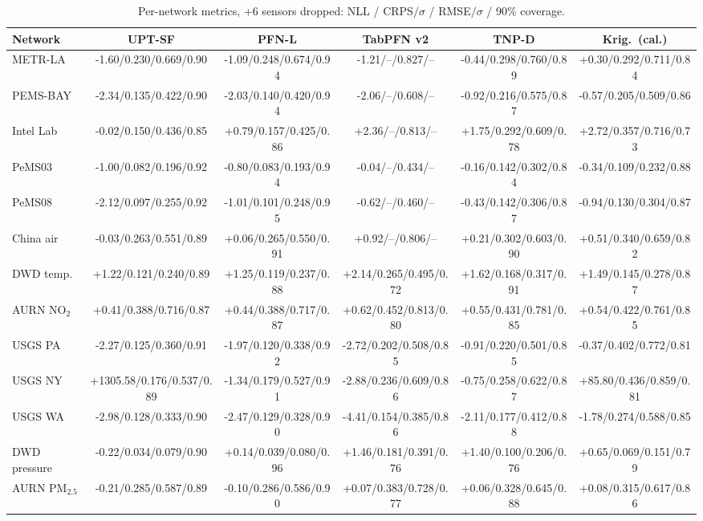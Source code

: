 \begin{table}[h]\centering\scriptsize
\caption{Per-network metrics, +6 sensors dropped: NLL / CRPS$/\sigma$ / RMSE$/\sigma$ / 90\% coverage.}
\setlength{\tabcolsep}{2pt}
\begin{adjustbox}{max width=\linewidth}
\begin{tabular}{lccccc}
\toprule
Network & UPT-SF & PFN-L & TabPFN v2 & TNP-D & Krig.\ (cal.) \\
\midrule
METR-LA & -1.60/0.230/0.669/0.90 & -1.09/0.248/0.674/0.94 & -1.21/--/0.827/-- & -0.44/0.298/0.760/0.89 & +0.30/0.292/0.711/0.84 \\
PEMS-BAY & -2.34/0.135/0.422/0.90 & -2.03/0.140/0.420/0.94 & -2.06/--/0.608/-- & -0.92/0.216/0.575/0.87 & -0.57/0.205/0.509/0.86 \\
Intel Lab & -0.02/0.150/0.436/0.85 & +0.79/0.157/0.425/0.86 & +2.36/--/0.813/-- & +1.75/0.292/0.609/0.78 & +2.72/0.357/0.716/0.73 \\
PeMS03 & -1.00/0.082/0.196/0.92 & -0.80/0.083/0.193/0.94 & -0.04/--/0.434/-- & -0.16/0.142/0.302/0.84 & -0.34/0.109/0.232/0.88 \\
PeMS08 & -2.12/0.097/0.255/0.92 & -1.01/0.101/0.248/0.95 & -0.62/--/0.460/-- & -0.43/0.142/0.306/0.87 & -0.94/0.130/0.304/0.87 \\
China air & -0.03/0.263/0.551/0.89 & +0.06/0.265/0.550/0.91 & +0.92/--/0.806/-- & +0.21/0.302/0.603/0.90 & +0.51/0.340/0.659/0.82 \\
DWD temp. & +1.22/0.121/0.240/0.89 & +1.25/0.119/0.237/0.88 & +2.14/0.265/0.495/0.72 & +1.62/0.168/0.317/0.91 & +1.49/0.145/0.278/0.87 \\
AURN NO$_2$ & +0.41/0.388/0.716/0.87 & +0.44/0.388/0.717/0.87 & +0.62/0.452/0.813/0.80 & +0.55/0.431/0.781/0.85 & +0.54/0.422/0.761/0.85 \\
USGS PA & -2.27/0.125/0.360/0.91 & -1.97/0.120/0.338/0.92 & -2.72/0.202/0.508/0.85 & -0.91/0.220/0.501/0.85 & -0.37/0.402/0.772/0.81 \\
USGS NY & +1305.58/0.176/0.537/0.89 & -1.34/0.179/0.527/0.91 & -2.88/0.236/0.609/0.86 & -0.75/0.258/0.622/0.87 & +85.80/0.436/0.859/0.81 \\
USGS WA & -2.98/0.128/0.333/0.90 & -2.47/0.129/0.328/0.90 & -4.41/0.154/0.385/0.86 & -2.11/0.177/0.412/0.88 & -1.78/0.274/0.588/0.85 \\
DWD pressure & -0.22/0.034/0.079/0.90 & +0.14/0.039/0.080/0.96 & +1.46/0.181/0.391/0.76 & +1.40/0.100/0.206/0.76 & +0.65/0.069/0.151/0.79 \\
AURN PM$_{2.5}$ & -0.21/0.285/0.587/0.89 & -0.10/0.286/0.586/0.90 & +0.07/0.383/0.728/0.77 & +0.06/0.328/0.645/0.88 & +0.08/0.315/0.617/0.86 \\
\bottomrule
\end{tabular}
\end{adjustbox}
\end{table}